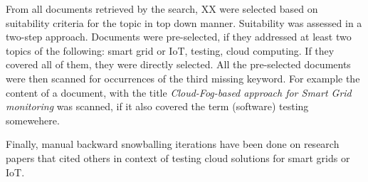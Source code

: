 From all documents retrieved by the search, XX were selected based on suitability criteria for the topic in top down manner. Suitability was assessed in a two-step approach. Documents were pre-selected, if they addressed at least two topics of the following: smart grid or IoT, testing, cloud computing. If they covered all of them, they were directly selected. All the pre-selected documents were then scanned for occurrences of the third missing keyword. For example the content of a document, with the title \textit{Cloud-Fog-based approach for Smart Grid monitoring} was scanned, if it also covered the term (software) testing somewehere. 

Finally, manual backward snowballing iterations have been done on research papers that cited others in context of testing cloud solutions for smart grids or IoT.

